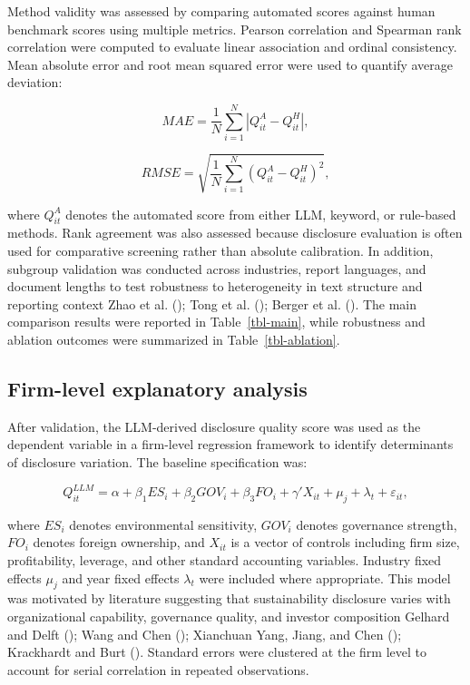 \documentclass[
  12pt,
]{article}
\begin{document}
Method validity was assessed by comparing automated scores against human
benchmark scores using multiple metrics. Pearson correlation and
Spearman rank correlation were computed to evaluate linear association
and ordinal consistency. Mean absolute error and root mean squared error
were used to quantify average deviation:

\[
MAE = \frac{1}{N}\sum_{i=1}^{N}\left|Q^{A}_{it} - Q^H_{it}\right|,
\]

\[
RMSE = \sqrt{\frac{1}{N}\sum_{i=1}^{N}\left(Q^{A}_{it} - Q^H_{it}\right)^2},
\]

where \(Q^{A}_{it}\) denotes the automated score from either LLM,
keyword, or rule-based methods. Rank agreement was also assessed because
disclosure evaluation is often used for comparative screening rather
than absolute calibration. In addition, subgroup validation was
conducted across industries, report languages, and document lengths to
test robustness to heterogeneity in text structure and reporting context
Zhao et al. (); Tong et al.
(); Berger et al.
(). The main comparison results were
reported in Table~\ref{tbl-main}, while robustness and ablation outcomes
were summarized in Table~\ref{tbl-ablation}.

\subsection{Firm-level explanatory
analysis}\label{firm-level-explanatory-analysis}

After validation, the LLM-derived disclosure quality score was used as
the dependent variable in a firm-level regression framework to identify
determinants of disclosure variation. The baseline specification was:

\[
Q^{LLM}_{it} = \alpha + \beta_1 ES_i + \beta_2 GOV_i + \beta_3 FO_i + \gamma'X_{it} + \mu_j + \lambda_t + \varepsilon_{it},
\]

where \(ES_i\) denotes environmental sensitivity, \(GOV_i\) denotes
governance strength, \(FO_i\) denotes foreign ownership, and \(X_{it}\)
is a vector of controls including firm size, profitability, leverage,
and other standard accounting variables. Industry fixed effects
\(\mu_j\) and year fixed effects \(\lambda_t\) were included where
appropriate. This model was motivated by literature suggesting that
sustainability disclosure varies with organizational capability,
governance quality, and investor composition Gelhard and Delft
(); Wang and Chen
(); Xianchuan Yang, Jiang, and Chen
(); Krackhardt and Burt
(). Standard errors were clustered at
the firm level to account for serial correlation in repeated
observations.
\end{document}
